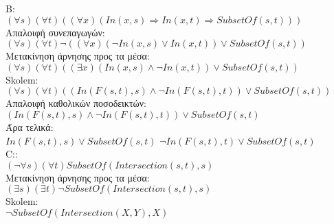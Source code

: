 \documentclass[12pt,a4paper]{article}
\begin{document}
Β:\\
$(\forall s)(\forall t)((\forall x)(In(x,s)\Rightarrow In(x,t)\Rightarrow SubsetOf(s,t)))$\\
Απαλοιφή συνεπαγωγών:\vspace{1mm}\\
$(\forall s)(\forall t)\neg((\forall x)(\neg In(x,s)\vee In(x,t))\vee SubsetOf(s,t))$\\
Μετακίνηση άρνησης προς τα μέσα:\vspace{1mm}\\
$(\forall s)(\forall t)((\exists x)(In(x,s)\wedge\neg In(x,t))\vee SubsetOf(s,t))$\\
\textlatin{Skolem:}\vspace{1mm}\\
$(\forall s)(\forall t)((In(F(s,t),s)\wedge\neg In(F(s,t),t))\vee SubsetOf(s,t))$\\
Απαλοιφή καθολικών ποσοδεικτών:\vspace{1mm}\\
$(In(F(s,t),s)\wedge\neg In(F(s,t),t))\vee SubsetOf(s,t)$\\
Άρα τελικά:\vspace{1mm}\\
$In(F(s,t),s)\vee SubsetOf(s,t)$
$\neg In(F(s,t),t)\vee SubsetOf(s,t)$\vspace{3mm}\\

\textlatin{C:}:\\
$(\neg\forall s)(\forall t)SubsetOf(Intersection(s,t),s)$\\
Μετακίνηση άρνησης προς τα μέσα:\vspace{1mm}\\
$(\exists s)(\exists t)\neg SubsetOf(Intersection(s,t),s)$\\
\textlatin{Skolem}:\vspace{1mm}\\
$\neg SubsetOf(Intersection(X,Y),X)$\vspace{3mm}\\
\end{document}
